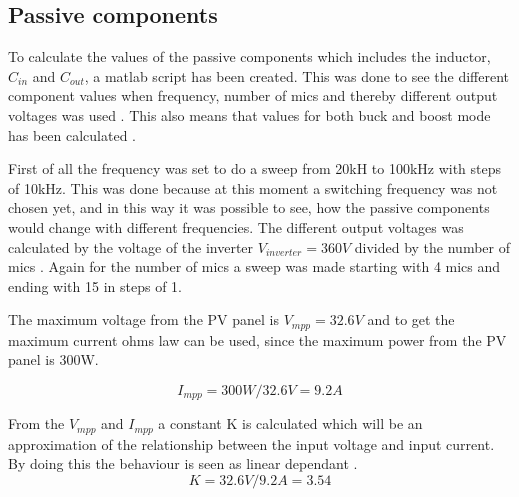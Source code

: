 \subsection{Passive components}  \label{passives}
To calculate the values of the passive components which includes the inductor, $C_{in}$ and $C_{out}$, a matlab  script has been created. This was done to see the different component values when frequency, number of mics and thereby different output voltages was used . This also means that values for both buck and boost mode has been calculated .

First of all the frequency was set to do a sweep from 20kH to 100kHz with steps of 10kHz. This was done because at this moment a switching frequency was not chosen yet, and in this way it was possible to see, how the passive components would change with different frequencies. 
The different output voltages was calculated by the voltage of the inverter $V_{inverter}=360V$ divided by the number of mics . Again for the number of mics a sweep was made starting with 4 mics and ending with 15 in steps of 1.

The maximum voltage from the PV panel is $V_{mpp}=32.6V$ 
and to get the maximum current ohms law can be used, since the maximum power from the PV panel is 300W.

\begin{equation}
I_{mpp} = 300W/32.6V = 9.2A
\end{equation} 

From the $V_{mpp}$ and $I_{mpp}$ a constant K is calculated which will be an approximation of the relationship between the input voltage and input current.
By doing this the behaviour is seen as linear dependant .
\begin{equation}
 K = 32.6V/9.2A = 3.54
 \end{equation} 

